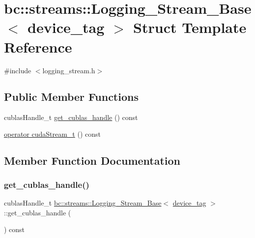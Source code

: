 \hypertarget{structbc_1_1streams_1_1Logging__Stream__Base_3_01device__tag_01_4}{}\section{bc\+:\+:streams\+:\+:Logging\+\_\+\+Stream\+\_\+\+Base$<$ device\+\_\+tag $>$ Struct Template Reference}
\label{structbc_1_1streams_1_1Logging__Stream__Base_3_01device__tag_01_4}


{\ttfamily \#include $<$logging\+\_\+stream.\+h$>$}

\subsection*{Public Member Functions}
\begin{DoxyCompactItemize}
\item 
cublas\+Handle\+\_\+t \hyperlink{structbc_1_1streams_1_1Logging__Stream__Base_3_01device__tag_01_4_a27adf08637decdc927d3f201b36afb00}{get\+\_\+cublas\+\_\+handle} () const
\item 
\hyperlink{structbc_1_1streams_1_1Logging__Stream__Base_3_01device__tag_01_4_a1e263882018f98cc9e52df10ade5a3fc}{operator cuda\+Stream\+\_\+t} () const
\end{DoxyCompactItemize}


\subsection{Member Function Documentation}
\mbox{\label{structbc_1_1streams_1_1Logging__Stream__Base_3_01device__tag_01_4_a27adf08637decdc927d3f201b36afb00}} 
\subsubsection{\texorpdfstring{get\+\_\+cublas\+\_\+handle()}{get\_cublas\_handle()}}
{\footnotesize\ttfamily cublas\+Handle\+\_\+t \hyperlink{structbc_1_1streams_1_1Logging__Stream__Base}{bc\+::streams\+::\+Logging\+\_\+\+Stream\+\_\+\+Base}$<$ \hyperlink{structbc_1_1device__tag}{device\+\_\+tag} $>$\+::get\+\_\+cublas\+\_\+handle (\begin{DoxyParamCaption}{ }\end{DoxyParamCaption}) const\hspace{0.3cm}{\ttfamily [inline]}}

